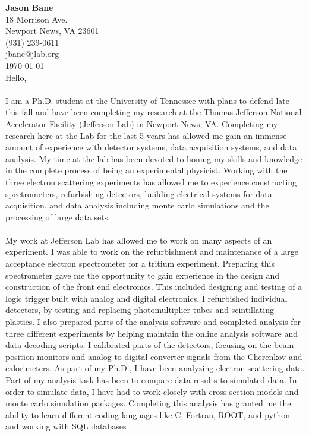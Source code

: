 \documentclass[12pt,letterpaper]{article}
\newcommand{\CPP}
{C\nolinebreak[4]\hspace{-.05em}\raisebox{.22ex}{\footnotesize\bf ++}}
\begin{document}
\iffalse	
	\vspace*{-1.2cm}
	{\textbf{Jason Bane}}\\
	18 Morrison Ave. \\
	Newport News, VA 23601 \\
	(931) 239-0611 \\
	jbane@jlab.org \\
	\today\\
	
	Hello, 
	
	\paragraph{}I am a Ph.D. student at the University of Tennessee with plans to defend late this fall and have been completing my research at the Thomas Jefferson National Accelerator Facility (Jefferson Lab) in Newport News, VA. Completing my research here at the Lab for the last 5 years has allowed me gain an immense amount of experience with detector systems, data acquisition systems, and data analysis. My time at the lab has been devoted to honing my skills and knowledge in the complete process of being an experimental physicist. Working with the three electron scattering experiments has allowed me to experience constructing spectrometers, refurbishing detectors, building electrical systems for data acquisition, and data analysis including monte carlo simulations and the processing of large data sets.  
	\paragraph{}My work at Jefferson Lab has allowed me to work on many aspects of an experiment. I was able to work on the refurbishment and maintenance of a large acceptance electron spectrometer for a tritium experiment. Preparing this spectrometer gave me the opportunity to gain experience in the design and construction of the front end electronics. This included designing and testing of a logic trigger built with analog and digital electronics. I refurbished individual detectors, by testing and replacing photomultiplier tubes and scintillating plastics.  
	I also prepared parts of the analysis software and completed analysis for three different experiments by helping maintain the online analysis software and data decoding scripts. I calibrated parts of the detectors, focusing on the beam position monitors and analog to digital converter signals from the Cherenkov and calorimeters. As part of my Ph.D., I have been analyzing electron scattering data. Part of my analysis task has been to compare data results to simulated data. In order to simulate data, I have had to work closely with cross-section models and monte carlo simulation packages. Completing this analysis has granted me the ability to learn different coding languages like \CPP, Fortran, ROOT, and python and working with SQL databases   
	
\end{document}
